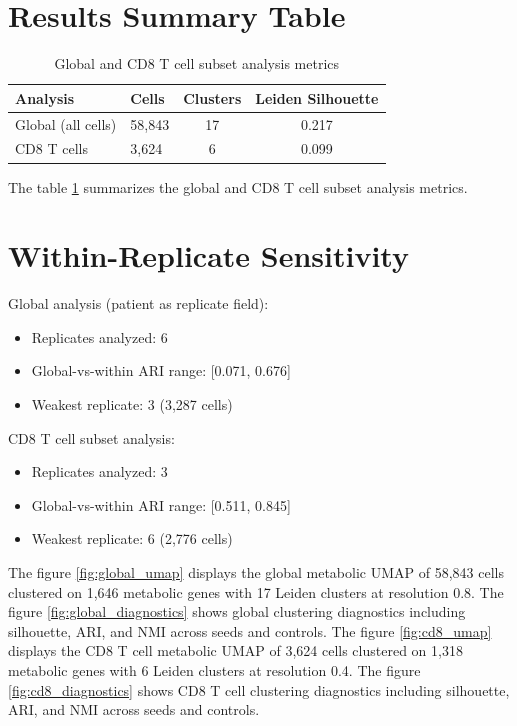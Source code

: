 \documentclass[11pt, a4paper]{article}
\begin{document}
\section{Results Summary Table}

\begin{table}[h!]
\centering
\caption{Global and CD8 T cell subset analysis metrics}
\label{tab:metrics}
\begin{tabular}{llcc}
\toprule
\textbf{Analysis} & \textbf{Cells} & \textbf{Clusters} & \textbf{Leiden Silhouette} \\
\midrule
Global (all cells) & 58,843 & 17 & 0.217 \\
CD8 T cells & 3,624 & 6 & 0.099 \\
\bottomrule
\end{tabular}
\end{table}

The table \ref{tab:metrics} summarizes the global and CD8 T cell subset analysis metrics.

\section{Within-Replicate Sensitivity}

Global analysis (patient as replicate field):
\begin{itemize}
    \item Replicates analyzed: 6
    \item Global-vs-within ARI range: [0.071, 0.676]
    \item Weakest replicate: 3 (3,287 cells)
\end{itemize}

CD8 T cell subset analysis:
\begin{itemize}
    \item Replicates analyzed: 3
    \item Global-vs-within ARI range: [0.511, 0.845]
    \item Weakest replicate: 6 (2,776 cells)
\end{itemize}

The figure \ref{fig:global_umap} displays the global metabolic UMAP of 58,843 cells clustered on 1,646 metabolic genes with 17 Leiden clusters at resolution 0.8. The figure \ref{fig:global_diagnostics} shows global clustering diagnostics including silhouette, ARI, and NMI across seeds and controls. The figure \ref{fig:cd8_umap} displays the CD8 T cell metabolic UMAP of 3,624 cells clustered on 1,318 metabolic genes with 6 Leiden clusters at resolution 0.4. The figure \ref{fig:cd8_diagnostics} shows CD8 T cell clustering diagnostics including silhouette, ARI, and NMI across seeds and controls.
\end{document}
